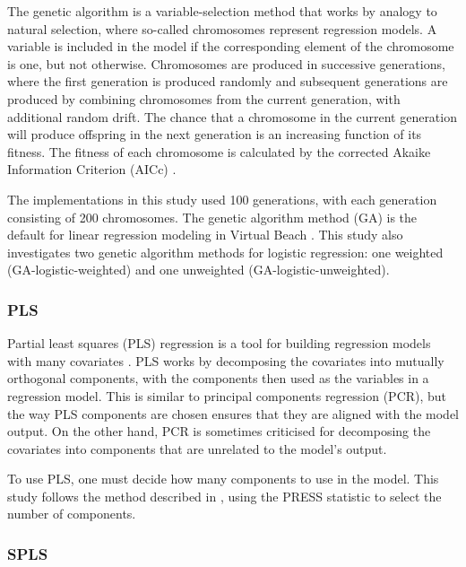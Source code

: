 \documentclass[english]{article}\usepackage[]{graphicx}\usepackage[]{color}
\numberwithin{equation}{section}
\numberwithin{figure}{section}
\renewcommand\[{\begin{equation}}
\renewcommand\]{\end{equation}}
\begin{document}
The genetic algorithm \citep{Fogel-1998} is a variable-selection
method that works by analogy to natural selection, where so-called
chromosomes represent regression models. A variable is included in
the model if the corresponding element of the chromosome is one, but
not otherwise. Chromosomes are produced in successive generations,
where the first generation is produced randomly and subsequent generations
are produced by combining chromosomes from the current generation,
with additional random drift. The chance that a chromosome in the
current generation will produce offspring in the next generation is
an increasing function of its fitness. The fitness of each chromosome
is calculated by the corrected Akaike Information Criterion (AICc)
\citet{Akaike-1973,Hurvich-Tsai-1989}.

The implementations in this study used 100 generations, with each
generation consisting of 200 chromosomes. The genetic algorithm method
(GA) is the default for linear regression modeling in Virtual Beach
\citep{Cyterski-Brooks-Galvin-Wolfe-Carvin-Roddick-Fienen-Corsi-2013}.
This study also investigates two genetic algorithm methods for logistic
regression: one weighted (GA-logistic-weighted) and one unweighted
(GA-logistic-unweighted).


\subsubsection{PLS}

Partial least squares (PLS) regression is a tool for building regression
models with many covariates \citep{Wold-Sjostrum-Eriksson-2001}.
PLS works by decomposing the covariates into mutually orthogonal components,
with the components then used as the variables in a regression model.
This is similar to principal components regression (PCR), but the
way PLS components are chosen ensures that they are aligned with the
model output. On the other hand, PCR is sometimes criticised for decomposing
the covariates into components that are unrelated to the model's output.

To use PLS, one must decide how many components to use in the model.
This study follows the method described in \citet{Brooks-Fienen-Corsi-2013},
using the PRESS statistic to select the number of components.


\subsubsection{SPLS}
\end{document}
